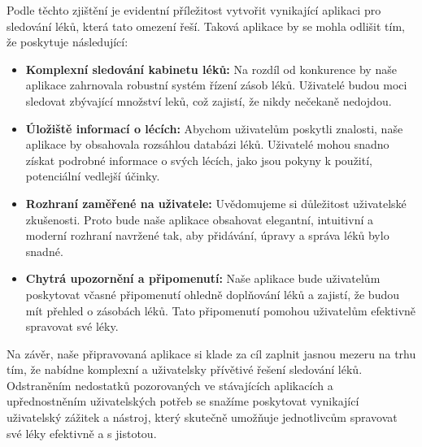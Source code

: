 \documentclass[a4paper, 11pt]{article}
\begin{document}
Podle těchto zjištění je evidentní příležitost vytvořit vynikající aplikaci pro sledování léků, která tato omezení řeší. Taková aplikace by se mohla odlišit tím, že poskytuje následující:
 \begin{itemize}
     \item \textbf{Komplexní sledování kabinetu léků:} Na rozdíl od konkurence by naše aplikace zahrnovala robustní systém řízení zásob léků. Uživatelé budou moci sledovat zbývající množství leků, což zajistí, že nikdy nečekaně nedojdou.
     \item \textbf{Úložiště informací o lécích:} Abychom uživatelům poskytli znalosti, naše aplikace by obsahovala rozsáhlou databázi léků. Uživatelé mohou snadno získat podrobné informace o svých lécích, jako jsou pokyny k použití, potenciální vedlejší účinky.
     \item \textbf{Rozhraní zaměřené na uživatele:} Uvědomujeme si důležitost uživatelské zkušenosti. Proto bude naše aplikace obsahovat elegantní, intuitivní a moderní rozhraní navržené tak, aby přidávání, úpravy a správa léků bylo snadné.
     \item \textbf{Chytrá upozornění a připomenutí:} Naše aplikace bude uživatelům poskytovat včasné připomenutí ohledně doplňování léků a zajistí, že budou mít přehled o zásobách léků. Tato připomenutí pomohou uživatelům efektivně spravovat své léky.
 \end{itemize}
Na závěr, naše připravovaná aplikace si klade za cíl zaplnit jasnou mezeru na trhu tím, že nabídne komplexní a uživatelsky přívětivé řešení sledování léků. Odstraněním nedostatků pozorovaných ve stávajících aplikacích a upřednostněním uživatelských potřeb se snažíme poskytovat vynikající uživatelský zážitek a nástroj, který skutečně umožňuje jednotlivcům spravovat své léky efektivně a s jistotou.
\end{document}
